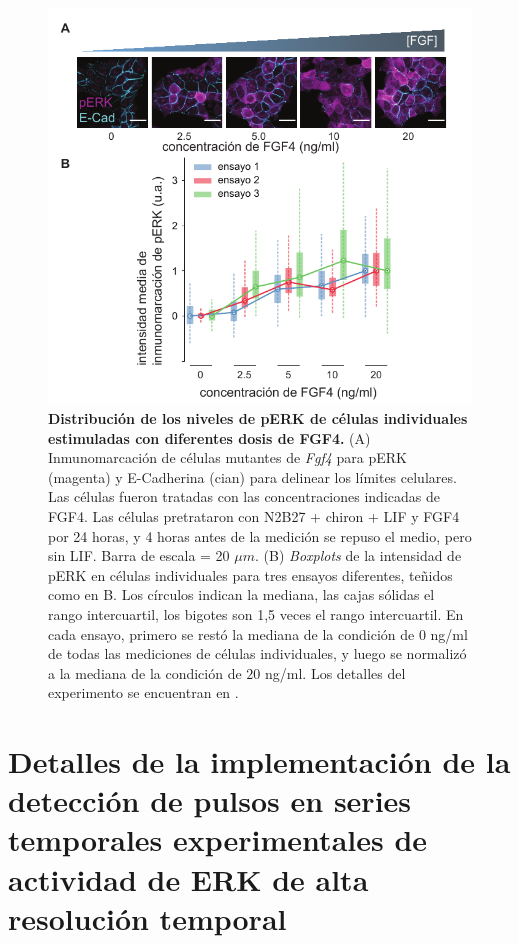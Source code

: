 \documentclass[./main.tex]{subfiles}
\begin{document}
\begin{subappendices}
\begin{figure}
    \centering
    \includegraphics[width=1\columnwidth]{figures/chapter3/C3_FGF_inmuno.pdf} 
    \caption{\textbf{Distribución de los niveles de pERK de células individuales estimuladas con diferentes dosis de FGF4.} (A) Inmunomarcación de células mutantes de \textit{Fgf4} para pERK (magenta) y E-Cadherina (cian) para delinear los límites celulares. Las células fueron tratadas con las concentraciones indicadas de FGF4. Las células pretrataron con  N2B27 + chiron + LIF y FGF4 por 24 horas, y 4 horas antes de la medición se repuso el medio, pero sin LIF. Barra de escala = 20 $\mu m$. (B) \textit{Boxplots} de la intensidad de pERK en células individuales para tres ensayos diferentes, teñidos como en B. Los círculos indican la mediana, las cajas sólidas el rango intercuartil, los bigotes son 1,5 veces el rango intercuartil. En cada ensayo, primero se restó la mediana de la condición de $0$ ng/ml de todas las mediciones de células individuales, y luego se normalizó a la mediana de la condición de $20$ ng/ml. Los detalles del experimento se encuentran en \cite{Fabris2022}.}
    \label{C3_fig:FGF_inmuno}
\end{figure}

\chapter{Detalles de la implementación de la detección de pulsos en series temporales experimentales de actividad de ERK de alta resolución temporal}


\end{subappendices}
\end{document}

